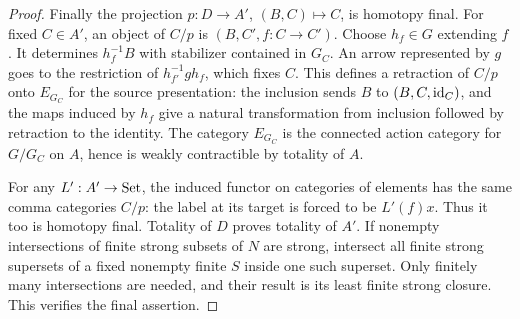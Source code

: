 \begin{proof}
Finally the projection $p:D\to A'$, $(B,C)\mapsto C$, is
homotopy final. For fixed $C\in A'$, an object of $C/p$ is
$(B,C',f:C\to C')$. Choose $h_f\in G$ extending $f$.
It determines $h_f^{-1}B$ with stabilizer contained in $G_C$.
An arrow represented by $g$ goes to the restriction of
$h_{f'}^{-1}g h_f$, which fixes $C$. This defines a retraction
of $C/p$ onto $E_{G_C}$ for the source presentation: the
inclusion sends $B$ to $(B,C,\mathrm{id}_C)$, and the maps induced
by $h_f$ give a natural transformation from inclusion followed
by retraction to the identity. The category $E_{G_C}$ is the
connected action category for $G/G_C$ on $A$, hence is weakly
contractible by totality of $A$.

For any $L':A'\to\mathrm{Set}$, the induced functor on categories
of elements has the same comma categories $C/p$: the label
at its target is forced to be $L'(f)x$. Thus it too is
homotopy final. Totality of $D$ proves totality of $A'$.
If nonempty intersections of finite strong subsets of $N$
are strong, intersect all finite strong supersets of a fixed
nonempty finite $S$ inside one such superset. Only finitely
many intersections are needed, and their result is its least
finite strong closure. This verifies the final assertion.
\end{proof}

